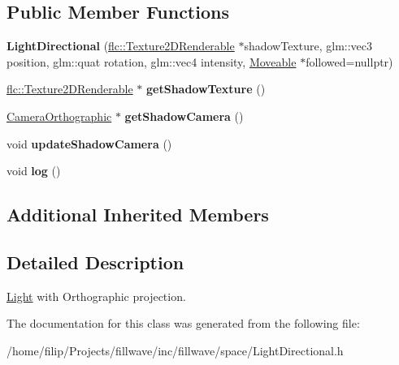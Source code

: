 \subsection*{Public Member Functions}
\begin{DoxyCompactItemize}
\item 
{\bfseries Light\+Directional} (\hyperlink{classflw_1_1flc_1_1Texture2DRenderable}{flc\+::\+Texture2\+D\+Renderable} $\ast$shadow\+Texture, glm\+::vec3 position, glm\+::quat rotation, glm\+::vec4 intensity, \hyperlink{classflw_1_1flf_1_1Moveable}{Moveable} $\ast$followed=nullptr)\hypertarget{classflw_1_1flf_1_1LightDirectional_a09b4fc109a231d81fccf59834abb1d92}{}\label{classflw_1_1flf_1_1LightDirectional_a09b4fc109a231d81fccf59834abb1d92}

\item 
\hyperlink{classflw_1_1flc_1_1Texture2DRenderable}{flc\+::\+Texture2\+D\+Renderable} $\ast$ {\bfseries get\+Shadow\+Texture} ()\hypertarget{classflw_1_1flf_1_1LightDirectional_af5551815e42ffc40f2c6e0062effa783}{}\label{classflw_1_1flf_1_1LightDirectional_af5551815e42ffc40f2c6e0062effa783}

\item 
\hyperlink{classflw_1_1flf_1_1CameraOrthographic}{Camera\+Orthographic} $\ast$ {\bfseries get\+Shadow\+Camera} ()\hypertarget{classflw_1_1flf_1_1LightDirectional_aac317eaf2b1e2666d16b3c56022d14b2}{}\label{classflw_1_1flf_1_1LightDirectional_aac317eaf2b1e2666d16b3c56022d14b2}

\item 
void {\bfseries update\+Shadow\+Camera} ()\hypertarget{classflw_1_1flf_1_1LightDirectional_aa5878fe2e64882fffbaa79d4175fe7a2}{}\label{classflw_1_1flf_1_1LightDirectional_aa5878fe2e64882fffbaa79d4175fe7a2}

\item 
void {\bfseries log} ()\hypertarget{classflw_1_1flf_1_1LightDirectional_a67447a8613048c46a43bac71738380d9}{}\label{classflw_1_1flf_1_1LightDirectional_a67447a8613048c46a43bac71738380d9}

\end{DoxyCompactItemize}
\subsection*{Additional Inherited Members}


\subsection{Detailed Description}
\hyperlink{classflw_1_1flf_1_1Light}{Light} with Orthographic projection. 

The documentation for this class was generated from the following file\+:\begin{DoxyCompactItemize}
\item 
/home/filip/\+Projects/fillwave/inc/fillwave/space/Light\+Directional.\+h\end{DoxyCompactItemize}
